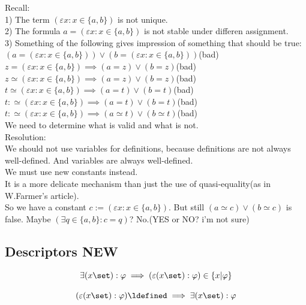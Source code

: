 Recall:\\
1) The term $(\varepsilon x: x \in \{a,b\})$ is not unique.\\
2) The formula $a=(\varepsilon x: x \in \{a,b\})$ is not stable under differen assignment.\\
3) Something of the following gives impression of something that should be true:
$(a=(\varepsilon x: x \in \{a,b\}))\lor(b=(\varepsilon x: x \in \{a,b\}))$(bad)\\
$z=(\varepsilon x: x \in \{a,b\}) \implies (a=z)\lor(b=z)$(bad)\\
$z\simeq (\varepsilon x: x \in \{a,b\}) \implies (a=z)\lor(b=z)$(bad)\\
$t\simeq (\varepsilon x: x \in \{a,b\}) \implies (a=t)\lor(b=t)$(bad)\\
$t:\simeq (\varepsilon x: x \in \{a,b\}) \implies (a=t)\lor(b=t)$(bad)\\
$t:\simeq (\varepsilon x: x \in \{a,b\}) \implies (a\simeq t)\lor(b\simeq t)$(bad)\\
We need to determine what is valid and what is not.\\
Resolution:\\
We should not use variables for definitions, because definitions are not always well-defined. And variables are always well-defined.\\
We must use new constants instead.\\
It is a more delicate mechanism than just the use of quasi-equality(as in W.Farmer's article).\\
So we have a constant $c:=(\varepsilon x: x \in \{a,b\})$.
But still $(a\simeq c)\lor(b\simeq c)$ is false.
Maybe $(\exists q\in\{a,b\}:c=q)$? No.(YES or NO? i'm not sure)



\subsection{Descriptors NEW}
\begin{axiom}
\[
\exists (x\set):\varphi
\implies
(\varepsilon (x\set): \varphi) \in \{x|\varphi\}
\]
\end{axiom}
\begin{axiom}

\[
(\varepsilon (x\set): \varphi) \ldefined
\implies
\exists (x\set):\varphi
\]
\end{axiom}

